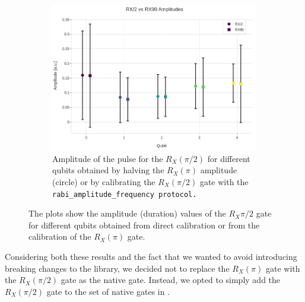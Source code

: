 \begin{figure}[h!]
\begin{subfigure}[t]{0.3\textwidth}
        \label{fig:RX90_duration}
    \end{subfigure}
    \hfill
    \begin{subfigure}[t]{0.3\textwidth}
        \includegraphics[width=\textwidth]{figures/png/RX90/rabi_af.png}
        \caption{Amplitude of the pulse for the $R_X(\pi/2)$ for different qubits obtained by halving the $R_X(\pi)$ amplitude (circle) or by calibrating the $R_X(\pi/2)$ gate with the \tt{rabi\_amplitude\_frequency} protocol.}
        \label{fig:RX90_af}
    \end{subfigure}
    \caption{The plots show the amplitude (duration) values of the $R_X{\pi/2}$ gate for different qubits obtained from direct calibration or from the calibration of the $R_X(\pi)$ gate.} 
    \label{fig:RXvsRX90}
\end{figure}

Considering both these results and the fact that we wanted to avoid introducing breaking changes to the library, we decided not to replace the $R_X(\pi)$ gate with the $R_X(\pi/2)$ gate as the native gate. Instead, we opted to simply add the $R_X(\pi/2)$ gate to the set of native gates in \Qibolab.

\newpage
{}

